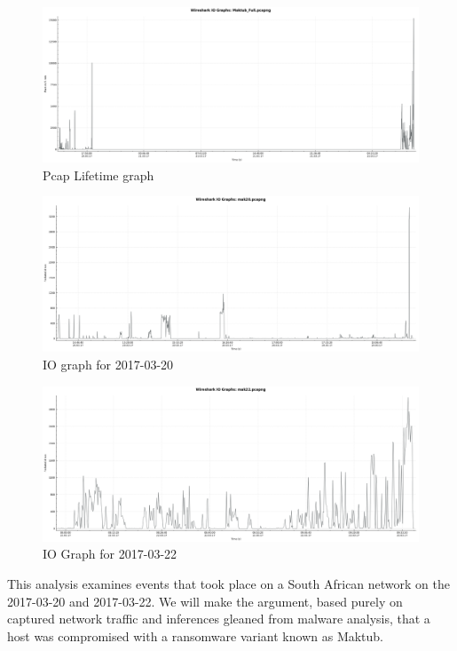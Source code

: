 \documentclass[11pt]{diazessay} %
\begin{document}
\begin{figure}[H]
        \centering
        \includegraphics[scale=0.30]{Maktub_Full.png}
    \caption{Pcap Lifetime graph}
\end{figure}

\begin{figure}[H]
        \centering
        \includegraphics[scale=0.30]{mak20.png}
    \caption{IO graph for 2017-03-20} 
\end{figure}

\begin{figure}[H]
        \centering
        \includegraphics[scale=0.30]{mak22.png}
    \caption{IO Graph for 2017-03-22}
\end{figure}

This analysis examines events that took place on a South African network on the 2017-03-20 and 2017-03-22. We will make the argument, based purely on captured network traffic and inferences gleaned from malware analysis, that a host was compromised with a ransomware variant known as Maktub. 
\end{document}
